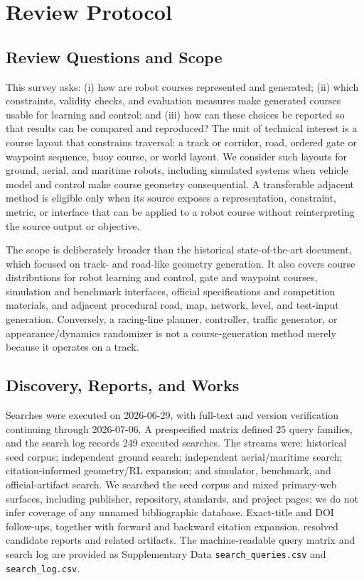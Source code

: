 \section{Review Protocol}
\label{sec:review-protocol}

\subsection{Review Questions and Scope}

This survey asks: (i) how are robot courses represented and generated; (ii)
which constraints, validity checks, and evaluation measures make generated courses
usable for learning and control; and (iii) how can these choices be reported so
that results can be compared and reproduced? The unit of technical interest is a
course layout that constrains traversal: a track or corridor, road, ordered gate
or waypoint sequence, buoy course, or world layout. We consider such layouts for
ground, aerial, and maritime robots, including simulated systems when vehicle
model and control make course geometry consequential. A transferable adjacent
method is eligible only when its source exposes a representation, constraint,
metric, or interface that can be applied to a robot course without reinterpreting
the source output or objective.

The scope is deliberately broader than the historical state-of-the-art document,
which focused on track- and road-like geometry generation. It also covers
course distributions for robot learning and control, gate and waypoint courses,
simulation and benchmark interfaces, official specifications and competition
materials, and adjacent procedural road, map, network, level, and test-input
generation. Conversely, a racing-line planner, controller, traffic generator,
or appearance/dynamics randomizer is not a course-generation method merely
because it operates on a track.

\subsection{Discovery, Reports, and Works}

Searches were executed on 2026-06-29, with full-text and version verification
continuing through 2026-07-06. A prespecified matrix defined 25 query families,
and the search log records 249 executed searches. The streams were: historical
seed corpus; independent ground search; independent aerial/maritime search;
citation-informed geometry/RL expansion; and simulator, benchmark, and
official-artifact search. We searched the seed corpus and mixed primary-web
surfaces, including publisher, repository, standards, and project pages; we do
not infer coverage of any unnamed bibliographic database. Exact-title and DOI
follow-ups, together with forward and backward citation expansion, resolved
candidate reports and related artifacts. The machine-readable query matrix and
search log are provided as Supplementary Data \texttt{search\_queries.csv} and
\texttt{search\_log.csv}.

